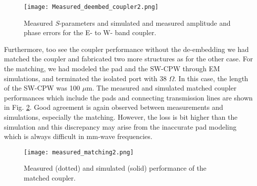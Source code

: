 \documentclass[journal]{IEEEtran}
\begin{document}
\begin{figure}
	\texttt{[image: Measured\_deembed\_coupler2.png]}
	\caption{Measured \textit{S}-parameters and simulated and measured amplitude and phase errors for the E- to W- band coupler.}
	\label{measurement1}
\end{figure}

Furthermore, too see the coupler performance without the de-embedding we had matched the
coupler and fabricated two more structures as for the other case. For the matching, we had modeled the pad and the SW-CPW through EM simulations, and terminated the isolated port with 38 $\Omega$. In this case, the length of the SW-CPW was 100 $\mu$m. The measured and simulated matched coupler performances which include the pads and connecting transmission lines are shown in Fig. \ref{measurement2}. Good agreement is again observed between measurements and simulations, especially the matching. However, the loss is bit higher than the simulation and this discrepancy may arise from the inaccurate pad modeling which is always difficult in mm-wave frequencies.

\begin{figure}
	\texttt{[image: measured\_matching2.png]}
	\caption{Measured (dotted) and simulated (solid) performance of the matched coupler.}
	\label{measurement2}
\end{figure}
\end{document}
